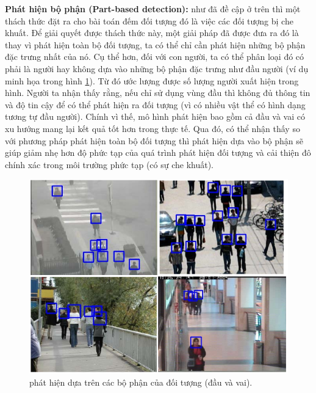 	\textbf{Phát hiện bộ phận (Part-based detection):} như đã đề cập ở trên thì một thách thức đặt ra cho bài toán đếm đối tượng đó là việc các đối tượng bị che khuất. Để giải quyết được thách thức này, một giải pháp đã được đưa ra đó là thay vì phát hiện toàn bộ đối tượng, ta có thể chỉ cần phát hiện những bộ phận đặc trưng nhất của nó. Cụ thể hơn, đối với con người, ta có thể phân loại đó có phải là người hay không dựa vào những bộ phận đặc trưng như đầu người (ví dụ minh họa trong hình \ref{head}). Từ đó ước lượng được số lượng người xuất hiện trong hình. Người ta nhận thấy rằng, nếu chỉ sử dụng vùng đầu thì không đủ thông tin và độ tin cậy để có thể phát hiện ra đối tượng (vì có nhiều vật thể có hình dạng tương tự đầu người). Chính vì thế, mô hình phát hiện bao gồm cả đầu và vai có xu hướng mang lại kết quả tốt hơn trong thực tế. Qua đó, có thể nhận thấy so với phương pháp phát hiện toàn bộ đối tượng thì phát hiện dựa vào bộ phận sẽ giúp giảm nhẹ hơn độ phức tạp của quá trình phát hiện đối tượng và cải thiện đô chính xác trong môi trường phức tạp (có sự che khuất).
\begin{figure}
  			\begin{center}
    				\includegraphics[scale=0.6]{head}
    				\caption{phát hiện dựa trên các bộ phận của đối tượng (đầu và vai).} 
    				\label{head}
  			\end{center}
\end{figure} 


